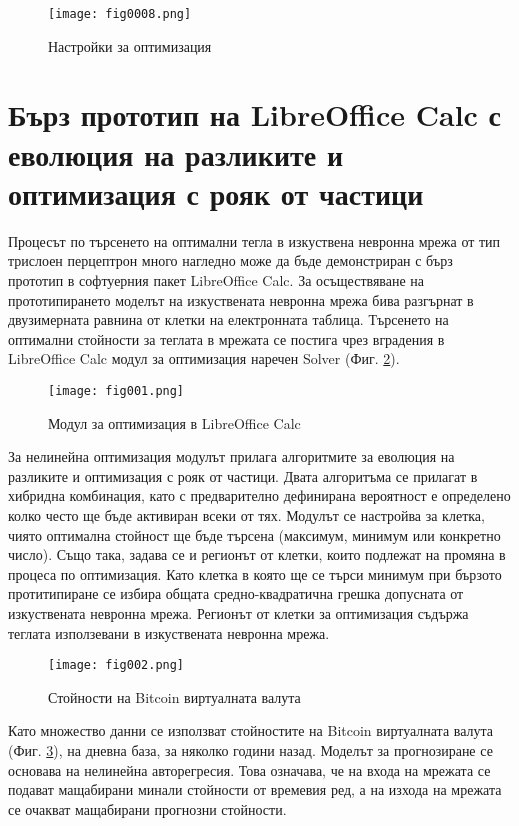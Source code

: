 \begin{figure}[h]
  \centering
  \texttt{[image: fig0008.png]}
  \caption{Настройки за оптимизация}
\label{fig0008}
\end{figure}

\section{Бърз прототип на LibreOffice Calc с еволюция на разликите и оптимизация с рояк от частици}

Процесът по търсенето на оптимални тегла в изкуствена невронна мрежа от тип трислоен перцептрон много нагледно може да бъде демонстриран с бърз прототип в софтуерния пакет LibreOffice Calc. За осъществяване на прототипирането моделът на изкуствената невронна мрежа бива разгърнат в двузимерната равнина от клетки на електронната таблица. Търсенето на оптимални стойности за теглата в мрежата се постига чрез вградения в LibreOffice Calc модул за оптимизация наречен Solver (Фиг. \ref{fig001}).

\begin{figure}[h]
  \centering
  \texttt{[image: fig001.png]}
  \caption{Модул за оптимизация в LibreOffice Calc}
\label{fig001}
\end{figure}

За нелинейна оптимизация модулът прилага алгоритмите за еволюция на разликите и оптимизация с рояк от частици. Двата алгоритъма се прилагат в хибридна комбинация, като с предварително дефинирана вероятност е определено колко често ще бъде активиран всеки от тях. Модулът се настройва за клетка, чиято оптимална стойност ще бъде търсена (максимум, минимум или конкретно число). Също така, задава се и регионът от клетки, които подлежат на промяна в процеса по оптимизация. Като клетка в която ще се търси минимум при бързото протитипиране се избира общата средно-квадратична грешка допусната от изкуствената невронна мрежа. Регионът от клетки за оптимизация съдържа теглата използевани в изкуствената невронна мрежа. 

\begin{figure}[h]
  \centering
  \texttt{[image: fig002.png]}
  \caption{Стойности на Bitcoin виртуалната валута}
\label{fig002}
\end{figure}

Като множество данни се използват стойностите на Bitcoin виртуалната валута (Фиг. \ref{fig002}), на дневна база, за няколко години назад. Моделът за прогнозиране се основава на нелинейна авторегресия. Това означава, че на входа на мрежата се подават мащабирани минали стойности от времевия ред, а на изхода на мрежата се очакват мащабирани прогнозни стойности. 

